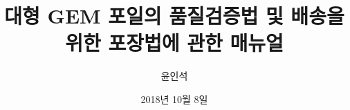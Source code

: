 \documentclass[11pt]{article}
\title{대형 GEM 포일의 품질검증법 및 배송을 위한 포장법에 관한 매뉴얼}
\author{윤인석}
\date{2018년 10월 8일}
\begin{document}
\maketitle

\begin{abstract}
  
\end{abstract}

\clearpage

\tableofcontents
\listoffigures
\listoftables

\clearpage







\appendix
  
\end{document}
